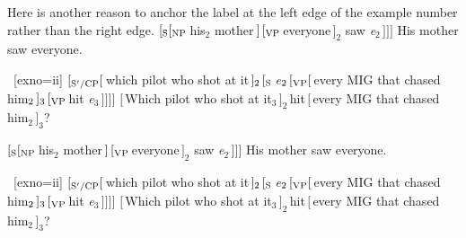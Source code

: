 Here is another reason to anchor the label at the left edge of the
example number rather than the right edge.
\pex[exno=i]
\a $[_{\rm S}[_{\rm NP}\,$his$_2$ mother$\,]\,[_{\rm
VP}\,$everyone$\,]_2$ saw
{\it e}$_2\,]]]$
\a \ljudge* His mother saw everyone.
\xe

\pex~[exno=ii]
\a \ljudge*$[_{\rm S'/CP}[\,$which pilot who shot at
it$\,]_2\,[_{\rm S}\,${\it e}$_2\,[_{\rm VP}[\,$every MIG that
chased him$_2\,]_3\,[_{\rm VP}\,$hit {\it e}$_3\,]]]]$
\a $[\,$Which pilot who shot at it$_3\,]_2\,$hit$\,[\,$every MIG
that chased him$_2\,]_3$?
\xe

\pex[exno=i]
\a $[_{\rm S}[_{\rm NP}\,$his$_2$ mother$\,]\,[_{\rm
VP}\,$everyone$\,]_2$ saw
{\it e}$_2\,]]]$
\a \ljudge* His mother saw everyone.
\xe

\pex~[exno=ii]
\a \ljudge*$[_{\rm S'/CP}[\,$which pilot who shot at
it$\,]_2\,[_{\rm S}\,${\it e}$_2\,[_{\rm VP}[\,$every MIG that
chased him$_2\,]_3\,[_{\rm VP}\,$hit {\it e}$_3\,]]]]$
\a $[\,$Which pilot who shot at it$_3\,]_2\,$hit$\,[\,$every MIG
that chased him$_2\,]_3$?
\xe

\endgroup

\endinput


